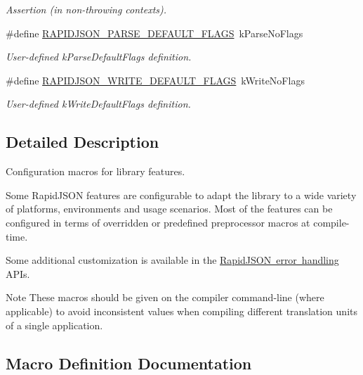\begin{DoxyCompactItemize}
\begin{DoxyCompactList}\small\item\em Assertion (in non-\/throwing contexts). \end{DoxyCompactList}\item 
\#define \mbox{\hyperlink{group___r_a_p_i_d_j_s_o_n___c_o_n_f_i_g_ga77005e892e6601599beaf421b0395c31}{R\+A\+P\+I\+D\+J\+S\+O\+N\+\_\+\+P\+A\+R\+S\+E\+\_\+\+D\+E\+F\+A\+U\+L\+T\+\_\+\+F\+L\+A\+GS}}~k\+Parse\+No\+Flags
\begin{DoxyCompactList}\small\item\em User-\/defined k\+Parse\+Default\+Flags definition. \end{DoxyCompactList}\item 
\#define \mbox{\hyperlink{group___r_a_p_i_d_j_s_o_n___c_o_n_f_i_g_ga1975595e2f1dc20a2d4859f340ac88c6}{R\+A\+P\+I\+D\+J\+S\+O\+N\+\_\+\+W\+R\+I\+T\+E\+\_\+\+D\+E\+F\+A\+U\+L\+T\+\_\+\+F\+L\+A\+GS}}~k\+Write\+No\+Flags
\begin{DoxyCompactList}\small\item\em User-\/defined k\+Write\+Default\+Flags definition. \end{DoxyCompactList}\end{DoxyCompactItemize}


\subsection{Detailed Description}
Configuration macros for library features. 

Some Rapid\+J\+S\+ON features are configurable to adapt the library to a wide variety of platforms, environments and usage scenarios. Most of the features can be configured in terms of overridden or predefined preprocessor macros at compile-\/time.

Some additional customization is available in the \mbox{\hyperlink{group___r_a_p_i_d_j_s_o_n___e_r_r_o_r_s}{Rapid\+J\+S\+ON error handling}} A\+P\+Is.

\begin{DoxyNote}{Note}
These macros should be given on the compiler command-\/line (where applicable) to avoid inconsistent values when compiling different translation units of a single application. 
\end{DoxyNote}


\subsection{Macro Definition Documentation}
\mbox{\label{group___r_a_p_i_d_j_s_o_n___c_o_n_f_i_g_ga93fb983f78208d12c822376e1ea6d185}} 
